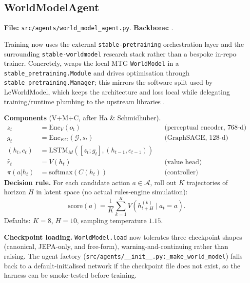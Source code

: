 \documentclass[11pt,a4paper]{article}
\begin{document}
\subsection{WorldModelAgent}
\textbf{File:} \texttt{src/agents/world\_model\_agent.py}.
\textbf{Backbone:} .

Training now uses the external \texttt{stable-pretraining} orchestration layer and the surrounding \texttt{stable-worldmodel} research stack rather than a bespoke in-repo trainer. Concretely,  wraps the local MTG \texttt{WorldModel} in a \texttt{stable\_pretraining.Module} and drives optimisation through \texttt{stable\_pretraining.Manager}; this mirrors the software split used by LeWorldModel, which keeps the architecture and loss local while delegating training/runtime plumbing to the upstream libraries \cite{balestriero2025stable,maes_lelidec2026swm,maes_lelidec2026lewm}.

\medskip\noindent\textbf{Components} (V+M+C, after Ha \& Schmidhuber).
\begin{align*}
z_t          &= \mathrm{Enc}_V(o_t)               &&\text{(perceptual encoder, 768-d)} \\
g_t          &= \mathrm{Enc}_{KG}(\mathcal{G}, s_t) &&\text{(GraphSAGE, 128-d)} \\
(h_t, c_t)   &= \mathrm{LSTM}_M([z_t;g_t], (h_{t-1}, c_{t-1})) \\
\hat r_t     &= V(h_t)                            &&\text{(value head)} \\
\pi(a|h_t)   &= \mathrm{softmax}(C(h_t))          &&\text{(controller)}
\end{align*}
%
\noindent\textbf{Decision rule.}  For each candidate action $a \in \mathcal{A}$,
roll out $K$ trajectories of horizon $H$ in latent space (no actual
rules-engine simulation):
%
\begin{equation}
\text{score}(a) = \frac{1}{K} \sum_{k=1}^{K} V(h^{(k)}_{t+H} \mid a_t=a).
\end{equation}
%
Defaults: $K=8$, $H=10$, sampling temperature $1.15$.

\medskip\noindent\textbf{Checkpoint loading.}  \texttt{WorldModel.load} now
tolerates three checkpoint shapes (canonical, JEPA-only, and
free-form), warning-and-continuing rather than raising.  The agent
factory (\texttt{src/agents/\_\_init\_\_.py:\_make\_world\_model}) falls
back to a default-initialised network if the checkpoint file does not
exist, so the harness can be smoke-tested before training.
\end{document}
